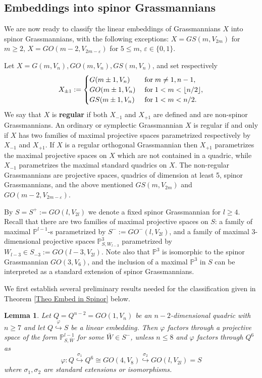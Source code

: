 \documentclass[12pt]{amsart}
\def\PP {{\mathbb P}}     %
\def\hw  {\hookrightarrow}
\newtheorem{lemma}[theorem]{Lemma}
\begin{document}
\subsection{Embeddings into spinor Grassmannians}\label{Sec Embedd into Spinor}


We are now ready to classify the linear embeddings of Grassmannians $X$ into spinor Grassmannians, with the following exceptions: $X=GS(m,V_{2m})$ for $m\geq 2$, $X=GO(m-2,V_{2m-\varepsilon})$ for $5\leq m$, $\varepsilon\in\{0,1\}$.

Let $X=G(m,V_n), GO(m,V_n), GS(m,V_n)$, and set respectively
$$
X_{\pm1} := \begin{cases} G(m\pm1,V_n) &\;{\rm for}\; m\ne 1,n-1, \\ GO(m\pm1,V_n) & \;{\rm for}\; 1<m<\lfloor n/2\rfloor, \\ GS(m\pm1,V_n) &\;{\rm for}\; 1<m<n/2. \end{cases}
$$
We say that $X$ is {\bf regular} if both $X_{-1}$ and $X_{+1}$ are defined and are non-spinor Grassmannians. An ordinary or symplectic Grassmannian $X$ is regular if and only if $X$ has two families of maximal projective spaces parametrized respectively by $X_{-1}$ and $X_{+1}$. If $X$ is a regular orthogonal Grassmannian then $X_{+1}$ parametrizes the maximal projective spaces on $X$ which are not contained in a quadric, while $X_{-1}$ parametrizes the maximal standard quadrics on $X$. The non-regular Grassmannians are projective spaces, quadrics of dimension at least 5, spinor Grassmannians, and the above mentioned $GS(m,V_{2m})$ and $GO(m-2,V_{2m-\varepsilon})$.

By $S=S^{+}:=GO(l,V_{2l})$ we denote a fixed spinor Grassmannian for $l\geq 4$. Recall that there are two families of maximal projective spaces on $S$: a family of maximal $\PP^{l-1}$-s parametrized by $S^{-}:=GO^-(l,V_{2l})$, and a family of maximal $3$-dimensional projective spaces $\PP^3_{S,W_{l-3}}$ parametrized by $W_{l-3}\in S_{-3}:=GO(l-3,V_{2l})$. Note also that $\PP^3$ is isomorphic to the spinor Grassmannian $GO(3,V_6)$, and the inclusion of a maximal $\PP^3$ in $S$ can be interpreted as a standard extension of spinor Grassmannians.

We first establish several preliminary results needed for the classification given in Theorem \ref{Theo Embed in Spinor} below.

\begin{lemma}\label{Lemma Quadrics in Spinors}
Let $Q=Q^{n-2}=GO(1,V_n)$ be an $n-2$-dimensional quadric with $n\geq 7$ and let $Q\stackrel{\varphi}{\hw} S$ be a linear embedding. Then $\varphi$ factors through a projective space of the form $\PP^{l-1}_{S,\bar W}$ for some $\bar W\in S^{-}$, unless $n\leq 8$ and $\varphi$ factors through $Q^6$ as
$$
\varphi: Q \stackrel{\sigma_1}{\hw} Q^6 \cong GO(4,V_8) \stackrel{\sigma_2}{\hw} GO(l,V_{2l}) =S
$$
where $\sigma_1,\sigma_2$ are standard extensions or isomorphisms.
\end{lemma}
\end{document}
